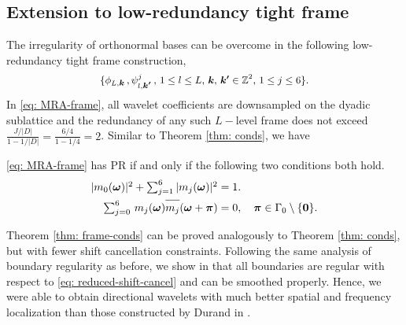 \subsection{Extension to low-redundancy tight frame}\label{sec: frame}
The irregularity of orthonormal bases can be overcome in the following low-redundancy tight frame construction,
 \begin{align}\label{eq: MRA-frame}
 \{\phi_{L,\boldsymbol{k}}\,,\psi^j_{l,\boldsymbol{k'}}\,, \, {\small 1\leq l \leq L,\, \boldsymbol{k},\,\boldsymbol{k'}\in \mathbb{Z}^2,\,1\leq j \leq 6\}}.
\end{align}  
In \eqref{eq: MRA-frame}, all wavelet coefficients are downsampled on the dyadic sublattice and the redundancy of any such $L-$level frame does not exceed $\frac{J/|D|}{1-1/|D|} = \frac{6/4}{1-1/4} = 2$.
Similar to Theorem \ref{thm: conds}, we have
\begin{thm}\label{thm: frame-conds}
\eqref{eq: MRA-frame} has PR if and only if the following two conditions both hold.
\begin{align}
\textstyle |m_0(\boldsymbol{\omega})|^2 + \sum_{j = 1}^6|m_j(\boldsymbol{\omega})|^2 &= 1. \\
\textstyle\sum_{j = 0}^6\,m_j(\boldsymbol{\omega})\overlinespace{m_j}(\boldsymbol{\omega} + \boldsymbol{\pi}) &= 0,\quad  \boldsymbol{\pi}\in \Gamma_0\setminus\{\boldsymbol{0}\}. \label{eq: reduced-shift-cancel}
\end{align}
\end{thm}
Theorem \ref{thm: frame-conds} can be proved analogously to Theorem \ref{thm: conds}, 
but with fewer shift cancellation constraints. Following the same analysis of boundary regularity as before, we show in \cite{yin2014orthshear} that all boundaries are regular with respect to \eqref{eq: reduced-shift-cancel} and can be smoothed properly. Hence, we were able to obtain directional wavelets with much better spatial and frequency localization than those constructed by Durand in \cite{durand2007}. 

